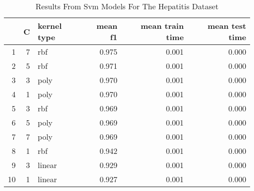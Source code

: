 \begin{table}
\centering
\caption{Results From Svm Models For The Hepatitis Dataset}
\label{tab:svm_results_hepatitis}
\begin{tabular}{rrlrrr}
\toprule
 & C & kernel type & mean f1 & mean train time & mean test time \\
\midrule
1 & 7 & rbf & 0.975 & 0.001 & 0.000 \\
2 & 5 & rbf & 0.971 & 0.001 & 0.000 \\
3 & 3 & poly & 0.970 & 0.001 & 0.000 \\
4 & 1 & poly & 0.970 & 0.001 & 0.000 \\
5 & 3 & rbf & 0.969 & 0.001 & 0.000 \\
6 & 5 & poly & 0.969 & 0.001 & 0.000 \\
7 & 7 & poly & 0.969 & 0.001 & 0.000 \\
8 & 1 & rbf & 0.942 & 0.001 & 0.000 \\
9 & 3 & linear & 0.929 & 0.001 & 0.000 \\
10 & 1 & linear & 0.927 & 0.001 & 0.000 \\
\bottomrule
\end{tabular}
\end{table}
